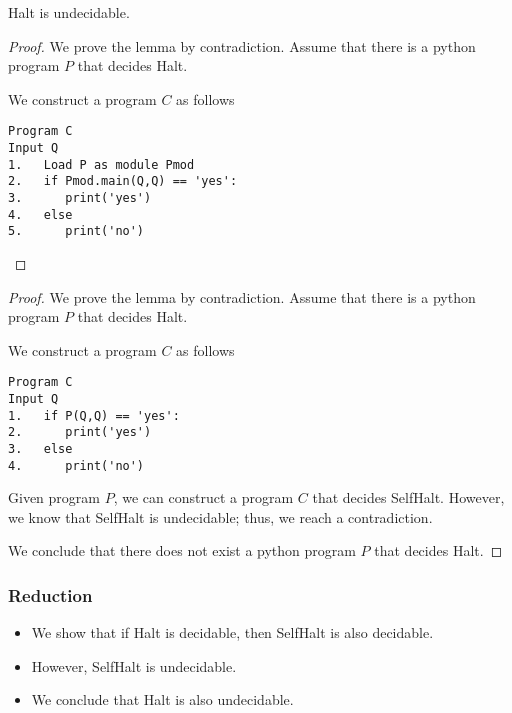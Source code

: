 \begin{frame}[fragile=true]
  \begin{lemma}
    {\sc Halt} is undecidable.
  \end{lemma}
  \begin{proof}
    We prove the lemma by contradiction.  Assume that there is a
    python program $P$ that decides {\sc Halt}. \pause

    We construct a program $C$ as follows
    {\small
\begin{verbatim}
Program C
Input Q
1.   Load P as module Pmod
2.   if Pmod.main(Q,Q) == 'yes':
3.      print('yes')
4.   else
5.      print('no')
\end{verbatim}
}
  \end{proof}
\end{frame}

\begin{frame}[fragile=true]
  \begin{proof}
    We prove the lemma by contradiction.  Assume that there is a
    python program $P$ that decides {\sc Halt}.

    We construct a program $C$ as follows
    {\small
\begin{verbatim}
Program C
Input Q
1.   if P(Q,Q) == 'yes':
2.      print('yes')
3.   else
4.      print('no')
\end{verbatim}
    }

    \pause

    Given program $P$, we can construct a program $C$ that decides
    {\sc SelfHalt}.  \pause However, we know that {\sc SelfHalt} is
    undecidable; thus, we reach a contradiction.

    We conclude that there does not exist a python program $P$ that
    decides {\sc Halt}.
  \end{proof}
\end{frame}

\begin{frame}
  \frametitle{Reduction}
  \pause

  \begin{itemize}
  \item We show that if {\sc Halt} is decidable, then {\sc SelfHalt} is
    also decidable.
    \pause
  \item However, {\sc SelfHalt is undecidable}.
    \pause
  \item We conclude that {\sc Halt} is also undecidable.
  \end{itemize}
\end{frame}

